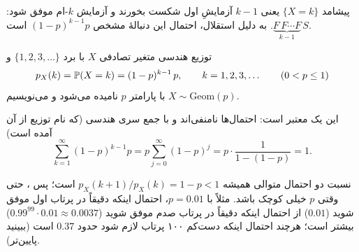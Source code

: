 پیشامد $\{X=k\}$ یعنی $k-1$ آزمایشِ اول شکست بخورند و آزمایش $k$-ام موفق شود: $\underbrace{F\,F\cdots F}_{k-1}\,S$. به دلیل استقلال، احتمال این دنبالهٔ مشخص $(1-p)^{k-1}p$ است.

\begin{definition}[label=def:geom]{توزیع هندسی}
متغیر تصادفی $X$ با برد $\{1,2,3,\dots\}$ و
\[ p_X(k)=\P(X=k)=(1-p)^{k-1}\,p,\qquad k=1,2,3,\dots\qquad(0<p\le1) \]
 با پارامتر $p$ نامیده می‌شود و می‌نویسیم $X\sim\mathrm{Geom}(p)$.
\end{definition}

این یک  معتبر است: احتمال‌ها نامنفی‌اند و با جمع سری هندسی (که نام توزیع از آن آمده است)
\[ \sum_{k=1}^{\infty}(1-p)^{k-1}p=p\sum_{j=0}^{\infty}(1-p)^{j}=p\cdot\frac{1}{1-(1-p)}=1. \]

\begin{figblock}

\end{figblock}

\begin{note}
نسبت دو احتمال متوالی همیشه $p_X(k+1)/p_X(k)=1-p<1$ است؛ پس ، حتی وقتی $p$ خیلی کوچک باشد. مثلاً با $p=0.01$، احتمال اینکه دقیقاً در پرتاب اول موفق شوید ($0.01$) از احتمال اینکه دقیقاً در پرتاب صدم موفق شوید ($0.99^{99}\cdot0.01\approx0.0037$) بیشتر است؛ هرچند احتمال اینکه دست‌کم ۱۰۰ پرتاب لازم شود حدود $0.37$ است (ببینید پایین‌تر).
\end{note}

